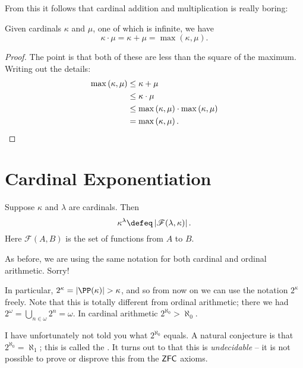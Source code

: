 From this it follows that cardinal addition and multiplication is really boring:
\begin{theorem}
	Given cardinals $\kappa$ and $\mu$, one of which is infinite,
	we have \[ \kappa \cdot \mu = \kappa + \mu = \max\left( \kappa, \mu \right).\]
\end{theorem}
\begin{proof}
	The point is that both of these are less than the square of the maximum.
	Writing out the details:
	\begin{align*}
		\max \left( \kappa, \mu \right)
		&\le \kappa + \mu \\ 
		&\le \kappa \cdot \mu \\ 
		&\le \max \left( \kappa, \mu \right) \cdot \max \left( \kappa, \mu  \right) \\
		&= \max\left( \kappa, \mu \right). \qedhere
	\end{align*}
\end{proof}




\section{Cardinal Exponentiation}
\begin{definition}
	Suppose $\kappa$ and $\lambda$ are cardinals.
	Then
	\[ \kappa^\lambda
		\defeq \left\lvert \mathscr F(\lambda, \kappa) \right\rvert.
	\]
	Here $\mathscr F(A,B)$ is the set of functions from $A$ to $B$.
\end{definition}

\begin{abuse}
	As before, we are using the same notation for
	both cardinal and ordinal arithmetic. Sorry!
\end{abuse}

In particular, $2^\kappa = \left\lvert \PP(\kappa) \right\rvert > \kappa$,
and so from now on we can use the notation $2^\kappa$ freely.
Note that this is totally different from ordinal arithmetic;
there we had $2^\omega = \bigcup_{n\in\omega} 2^n = \omega$.
In cardinal arithmetic $2^{\aleph_0} > \aleph_0$.

I have unfortunately not told you what $2^{\aleph_0}$ equals.
A natural conjecture is that $2^{\aleph_0} = \aleph_1$; this is called the
.
It turns out to that this is \emph{undecidable} -- it is not possible
to prove or disprove this from the $\mathsf{ZFC}$ axioms.

